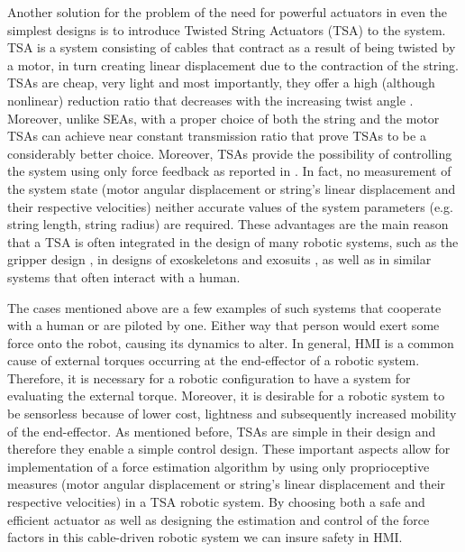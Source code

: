 Another solution for the problem of the need for powerful actuators in even the simplest designs is to introduce Twisted String Actuators (TSA) to the system.
TSA is a system consisting of cables that contract as a result of being twisted by a motor, in turn creating linear displacement due to the contraction of the string. TSAs are cheap, very light and most importantly, they offer a high (although nonlinear) reduction ratio that decreases with the increasing twist angle \cite{TSA_math_model}. Moreover, unlike SEAs, with a proper choice of both the string and the motor TSAs can achieve near constant transmission ratio that prove TSAs to be a considerably better choice. Moreover, TSAs provide the possibility of controlling the system using only force feedback as reported in \cite{TSA_intro}. In fact, no measurement of the system state (motor angular displacement or string's linear displacement and their respective velocities) neither accurate values of the system parameters (e.g. string length, string radius) are required.
These advantages are the main reason that a TSA is often integrated in the design of many robotic systems, such as the gripper design \cite{gripper}, in designs of exoskeletons and exosuits \cite{exo}, as well as in similar systems that often interact with a human.

The cases mentioned above are a few examples of such systems that cooperate with a human or are piloted by one. Either way that person would exert some force onto the robot, causing its dynamics to alter. In general, HMI is a common cause of external torques occurring at the end-effector of a robotic system. Therefore, it is necessary for a robotic configuration to have a system for evaluating the external torque. Moreover, it is desirable for a robotic system to be sensorless because of lower cost, lightness and subsequently increased mobility of the end-effector. As mentioned before, TSAs are simple in their design and therefore they enable a simple control design. These important aspects allow for implementation of a force estimation algorithm by using only proprioceptive measures (motor angular displacement or string's linear displacement and their respective velocities) in a TSA robotic system. By choosing both a safe and efficient actuator as well as designing the estimation and control of the force factors in this cable-driven robotic system we can insure safety in HMI.


